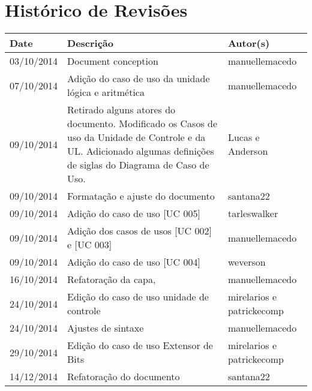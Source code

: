 \documentclass{article}
\begin{document}

\capa
\newpage

\section*{\center Histórico de Revisões}
  \vspace*{1cm}
  \begin{table}[ht]
    \centering
    \begin{tabular}[pos]{|m{2cm} | m{7.2cm} | m{3.8cm}|} 
      \hline
      \cellcolor[gray]{0.9}
      \textbf{Date} & \cellcolor[gray]{0.9}\textbf{Descrição} & \cellcolor[gray]{0.9}\textbf{Autor(s)}\\ \hline
      
      \small 03/10/2014 & \small Document conception &  manuellemacedo \\ \hline      
	
      \small 07/10/2014 & \small Adição do caso de uso da unidade lógica e aritmética &  manuellemacedo \\ \hline
      \small 09/10/2014 & \small Retirado alguns atores do documento. Modificado os Casos de uso da Unidade de Controle e da UL. Adicionado algumas definições de siglas do Diagrama de Caso de Uso. & Lucas e Anderson \\ \hline 
      \small 09/10/2014 & \small Formatação e ajuste do documento & santana22 \\ \hline
      \small 09/10/2014 & \small Adição do caso de uso [UC 005] & tarleswalker \\ \hline
      \small 09/10/2014 & \small Adição dos casos de usos [UC 002] e [UC 003] &  manuellemacedo \\ \hline
       \small 09/10/2014 & \small Adição do caso de uso [UC 004] & weverson \\ \hline
       \small 16/10/2014 & \small Refatoração da capa,  &  manuellemacedo \\ \hline
       \small 24/10/2014 & \small Edição do caso de uso unidade de controle  & \small mirelarios e patrickecomp \\ \hline
       \small 24/10/2014 & \small Ajustes de sintaxe  &  manuellemacedo \\ \hline
       \small 29/10/2014 & \small Edição do caso de uso Extensor de Bits  & \small mirelarios e patrickecomp \\ \hline
       \small 14/12/2014 & \small Refatoração do documento & santana22 \\ \hline
       
    \end{tabular}
  \end{table}
\end{document}
